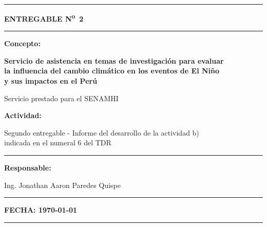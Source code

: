 \documentclass[11pt,a4paper]{article}
\begin{document}

\begin{titlepage}
\centering
\noindent\rule{\textwidth}{0.6pt}

\vspace{1.2cm}
{\Large \bfseries ENTREGABLE N\textsuperscript{o}~2 \par}
\vspace{1.2cm}
\rule{0.7\textwidth}{0.6pt}

\vspace{1.2cm}
{\normalsize \bfseries Concepto: \par}
\vspace{0.3cm}
{\large \bfseries Servicio de asistencia en temas de investigación para evaluar\\
la influencia del cambio climático en los eventos de El Niño\\
y sus impactos en el Perú \par}

\vspace{1.4cm}
{\small Servicio prestado para el SENAMHI \par}

\vspace{1.4cm}
{\normalsize \bfseries Actividad: \par}
\vspace{0.2cm}
{\normalsize Segundo entregable - Informe del desarrollo de la actividad b)\\
indicada en el numeral 6 del TDR \par}

\vspace{1.2cm}
\rule{0.7\textwidth}{0.6pt}

\vspace{0.3cm}
{\small \bfseries Responsable: \par}
\vspace{0.2cm}
{\small Ing. Jonathan Aaron Paredes Quispe \par}
\vspace{0.3cm}
\rule{0.7\textwidth}{0.6pt}

\vfill
{\small \bfseries FECHA: \today \par}
\vspace{0.6cm}
\noindent\rule{\textwidth}{0.6pt}
\end{titlepage}

\tableofcontents
\listoffigures
\listoftables
\clearpage
\end{document}
